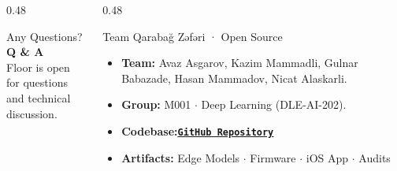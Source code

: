\begin{frame}[plain]
    \vspace{0.20cm}
    \begin{columns}[c]
        \begin{column}{0.48\textwidth}
            \begin{techblock}{Any Questions?}
                \vspace{0.35cm}
                \centering
                {\fontsize{18pt}{22pt}\selectfont\bfseries\color{PrimaryNavy} Q \& A}\\[0.25cm]
                {\footnotesize\color{DarkSlate!80} Floor is open for questions\\and technical discussion.}
                \vspace{0.35cm}
            \end{techblock}
        \end{column}

        \begin{column}{0.48\textwidth}
            \begin{techblock}{Team Qarabağ Zəfəri · Open Source}
                \scriptsize
                \begin{itemize}\setlength{\itemsep}{3.5pt}
                    \item \textbf{Team:} Avaz Asgarov, Kazim Mammadli, Gulnar Babazade, Hasan Mammadov, Nicat Alaskarli.
                    \item \textbf{Group:} M001 $\cdot$ Deep Learning (DLE-AI-202).
                    \item \textbf{Codebase:}\quad\href{https://github.com/AvazAsgarov/azerbaijani-banknote-vision}{\color{AccentBlue}\bfseries\underline{\texttt{GitHub Repository}}}
                    \item \textbf{Artifacts:} Edge Models $\cdot$ Firmware $\cdot$ iOS App $\cdot$ Audits
                \end{itemize}
            \end{techblock}
        \end{column}
    \end{columns}
\end{frame}
